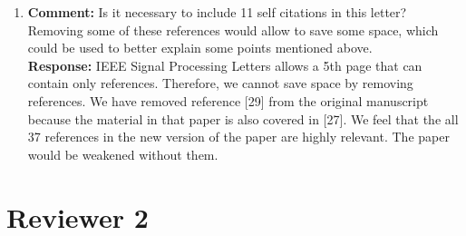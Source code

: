 \documentclass[a4paper,10pt]{article}
\begin{document}
\begin{enumerate}
\item\textbf{Comment:} 
Is it necessary to include 11 self citations in this letter? Removing some of
these references would allow to save some space, which could be used to better
explain some points mentioned above.
\\
\textbf{Response:}
IEEE Signal Processing Letters allows a 5th page that can contain only references.  Therefore, we cannot save space by removing references.   We have removed reference [29] from the original manuscript because the material in that paper is also covered in [27].  We feel that the all 37 references in the new version of the paper are highly relevant.  The paper would be weakened without them.

\end{enumerate}



\section*{Reviewer 2}
\end{document}
